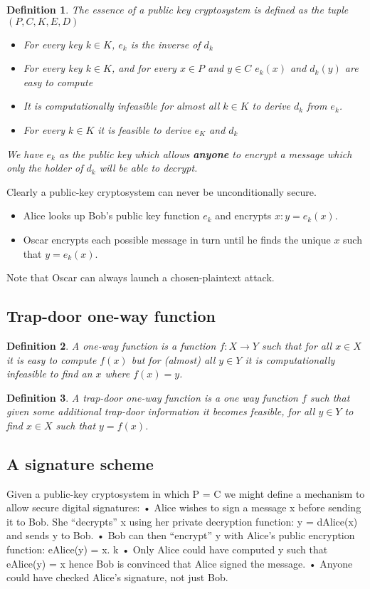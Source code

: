 \documentclass{article}
\theoremstyle{quest}
\newtheorem*{definition}{Definition}
\begin{document}
\begin{definition}
    The essence of a \textit{public key cryptosystem} is defined as the tuple
    $(P,C,K,E,D)$
    \begin{itemize}
        \item For every key $k \in K$, $e_k$ is the inverse of $d_k$
        \item For every key $k \in K$,
            and for every $x \in P$ and $y \in C$
            $e_k(x)$ and $d_k(y)$ are easy to compute
        \item It is computationally infeasible for almost all $k \in K$
            to derive $d_k$ from $e_k$.
        \item For every $k \in K$ it is feasible to derive $e_K$ and $d_k$
    \end{itemize}
    We have $e_k$ as the public key which allows \textbf{anyone} to encrypt a message
    which only the holder of $d_k$ will be able to decrypt.
\end{definition}

Clearly a public-key cryptosystem can never be unconditionally secure.
\begin{itemize}
    \item Alice looks up Bob’s public key function $e_k$ and encrypts $x : y = e_k(x)$.
    \item Oscar encrypts each possible message in turn until he finds the unique $x$ such that $y = e_k(x)$.
\end{itemize}
Note that Oscar can always launch a chosen-plaintext attack.

\subsection{Trap-door one-way function}
\begin{definition}
    A \textit{one-way function} is a function $f : X \rightarrow Y$ such that 
    for all $x \in X$ it is easy to compute $f(x)$ but for (almost) all $y \in Y$ it is computationally
    infeasible to find an $x$ where $f(x) = y$.
\end{definition}
\begin{definition}
    A \textit{trap-door one-way function} is a one way function $f$ such that
    given some additional trap-door information it becomes feasible, 
    for all $y \in Y$ to find $x \in X$ such that $y = f(x)$.
\end{definition}

\subsection{A signature scheme}
Given a public-key cryptosystem in which P = C we might define a mechanism to allow secure digital signatures:
• Alice wishes to sign a message x before sending it to Bob. She “decrypts” x using her private decryption function: y = dAlice(x) and sends y to Bob.
• Bob can then “encrypt” y with Alice’s public encryption function: eAlice(y) = x. k
• Only Alice could have computed y such that eAlice(y) = x hence Bob is convinced that
Alice signed the message.
• Anyone could have checked Alice’s signature, not just Bob.
\end{document}
